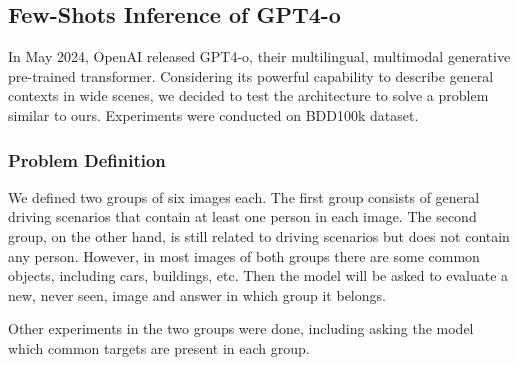 \subsection{Few-Shots Inference of GPT4-o}
In May 2024, OpenAI released GPT4-o, their multilingual, multimodal generative 
pre-trained transformer. Considering its powerful capability to describe general 
contexts in wide scenes, we decided to test the architecture to solve a problem 
similar to ours. Experiments were conducted on BDD100k dataset.

\subsubsection{Problem Definition}
We defined two groups of six images each. The first group consists of general 
driving scenarios that contain at least one person in each image. 
The second group, on the other hand, is still related to driving scenarios but 
does not contain any person. However, in most images of both groups there are 
some common objects, including cars, buildings, etc.
Then the model will be asked to evaluate a new, never seen, image and answer 
in which group it belongs.

Other experiments in the two groups were done, including asking the model which 
common targets are present in each group.

